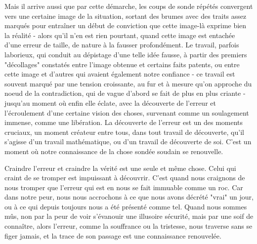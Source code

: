 Mais il arrive aussi que par cette démarche, les coups de sonde répétés convergent vers une certaine image de la situation, sortant des brumes avec des traits assez marqués pour entraîner un début de conviction que cette image-là exprime bien la réalité - alors qu'il n'en est rien pourtant, quand cette image est entachée d'une erreur de taille, de nature à la fausser profondément. Le travail, parfois laborieux, qui conduit au dépistage d'une telle idée fausse, à partir des premiers "décollages" constatés entre l'image obtenue et certains faits patents, ou entre cette image et d'autres qui avaient également notre confiance - ce travail est souvent marqué par une tension croissante, au fur et à mesure qu'on approche du noeud de la contradiction, qui de vague d'abord se fait de plus en plus criante - jusqu'au moment où enfin elle éclate, avec la découverte de l'erreur et l'écroulement d'une certaine vision des choses, survenant comme un soulagement immense, comme une libération. La découverte de l'erreur est un des moments cruciaux, un moment créateur entre tous, dans tout travail de découverte, qu'il s'agisse d'un travail mathématique, ou d'un travail de découverte de soi. C'est un moment où notre connaissance de la chose sondée soudain se renouvelle.

Craindre l'erreur et craindre la vérité est une seule et même chose. Celui qui craint de se tromper est impuissant à découvrir. C'est quand nous craignons de nous tromper que l'erreur qui est en nous se fait immuable comme un roc. Car dans notre peur, nous nous accrochons à ce que nous avons décrété "vrai" un jour, ou à ce qui depuis toujours nous a été présenté comme tel. Quand nous sommes mûs, non par la peur de voir s'évanouir une illusoire sécurité, mais par une soif de connaître, alors l'erreur, comme la souffrance ou la tristesse, nous traverse sans se figer jamais, et la trace de son passage est une connaissance renouvelée.
